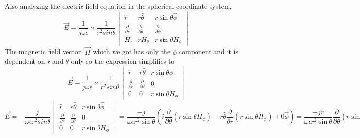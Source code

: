 Also analyzing the electric field equation in the spherical coordinate system, 
\begin{dmath*}
\vec{E}  = \frac{1}{j\omega \epsilon} \times \frac{1}{r^2sin\theta}
\begin{vmatrix}
\hat{r} & r\hat{\theta} & r\sin\theta\hat{\phi} \\ 
\frac{\partial}{\partial r} & \frac{\partial}{\partial \theta} &  \frac{\partial}{\partial \phi} \\
H_r & rH_\theta & r\sin\theta H_\phi              
\end{vmatrix}
\end{dmath*}
The magnetic field vector, $\vec{H}$ which we got has only the $\phi$ component and it is dependent on $r$ and $\theta$ only so the expression simplifies to 
\begin{dmath*}
\vec{E}  = \frac{1}{j\omega \epsilon} \times \frac{1}{r^2sin\theta}
\begin{vmatrix}
\hat{r} & r\hat{\theta} & r\sin\theta\hat{\phi} \\ 
\frac{\partial}{\partial r} & \frac{\partial}{\partial \theta} &  0 \\
0 & 0 & r\sin\theta H_\phi              
\end{vmatrix}
\end{dmath*}
\begin{dmath*}
\vec{E}  = -\frac{j}{\omega \epsilon r^2sin\theta}
\begin{vmatrix}
\hat{r} & r\hat{\theta} & r\sin\theta\hat{\phi} \\ 
\frac{\partial}{\partial r} & \frac{\partial}{\partial \theta} &  0 \\
0 & 0 & r\sin\theta H_\phi              
\end{vmatrix}  = \frac{-j}{\omega  \epsilon r^2\sin\theta}\left(\hat{r} \frac{\partial}{\partial \theta}\left(r\sin \theta H_{\phi}\right) - r\hat{\theta} \frac{\partial}{\partial r}(r\sin\theta H_{\phi}) + 0\hat{\phi}\right)
= \frac{-j \hat{r}}{\omega \epsilon r^2\sin\theta}\frac{\partial}{\partial \theta}(r\sin\theta H_{\phi}) + \frac{j \hat{\theta}}{\omega  \epsilon r\sin\theta}\frac{\partial}{\partial r}(r\sin\theta H_{\phi})
= \frac{-j \hat{r}}{\omega  \epsilon r\sin\theta}\frac{\partial}{\partial \theta}(\sin\theta H_{\phi}) + \frac{j \hat{\theta}}{\omega  \epsilon r}\frac{\partial}{\partial r}(r\sin\theta H_{\phi})
= \frac{-j \hat{r}}{\omega \epsilon r\sin\theta}\left(\sin\theta\frac{\partial }{\partial \theta}H_{\phi} + H_{\phi}\frac{d\sin\theta}{d\theta}\right) + \frac{j\hat{\theta}}{\omega \epsilon r}\left(r\frac{\partial}{\partial r}H_{\phi} + H_{\phi}\right)
\end{dmath*}
